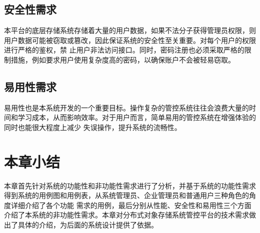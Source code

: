 


\subsection{安全性需求}

本平台的底层存储系统存储着大量的用户数据，如果不法分子获得管理员权限，则用户数据可能被窃取或篡改，因此保证系统的安全性至关重要。对每个用户的权限进行严格的鉴权，禁
止用户非法访问接口。同时，密码注册也必须采取严格的限制措施，例如要求用户使用复杂度高的密码，以确保账户不会被轻易窃取。

\subsection{易用性需求}

易用性也是本系统开发的一个重要目标。操作复杂的管控系统往往会浪费大量的时间和学习成本，从而影响效率。对于用户而言，简单易用的管控系统在增强体验的同时也能很大程度上减少
失误操作，提升系统的流畅性。

\section{本章小结}

本章首先针对系统的功能性和非功能性需求进行了分析，并基于系统的功能性需求得到系统的用例图和用例表，从系统管理员、企业管理员和普通用户三种角色的角度详细介绍了各个功能
需求的用例，最后分别从性能、安全性和易用性三个方面介绍了本系统的非功能性需求。本章对分布式对象存储系统管控平台的技术需求做出了具体的介绍，为后面的系统设计提供了依据。